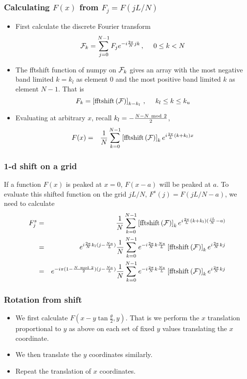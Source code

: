 \documentclass{beamer}
\begin{document}
\begin{frame}
\frametitle{Calculating $F(x)$ from $F_j=F(jL/N)$}
\begin{itemize}
\item
First calculate the discrete Fourier transform
\begin{equation}
{\cal F}_k  = \sum_{j=0}^{N-1} F_j e^{-i\frac{2\pi}{N} jk}\,,
\ \ \ \ 0 \le k < N
\end{equation}
\item
The fftshift function of numpy on ${\cal F}_k$ gives an array 
with the most negative band limited $k = k_l$ as element 0 and
the most positive band limited $k$ as element $N-1$. That is
\begin{equation}
F_k = \left [{\rm fftshift}\left ({\cal F}\right)\right ]_{k-k_l}\,,
\ \ \ \ k_l \leq k \leq k_u
\end{equation}
\item
Evaluating at arbitrary $x$, recall $k_l = -\frac{N- N~{\rm mod}~2}{2}$,
\begin{eqnarray*}
F(x) &=& \frac{1}{N}\sum_{k=0}^{N-1} \left [{\rm fftshift}\left({\cal F}\right)
\right ]_k e^{i\frac{2\pi}{L} (k+k_l) x}
\end{eqnarray*}

\end{itemize}
\end{frame}

\begin{frame}
\frametitle{1-d shift on a grid}
If a function $F(x)$ is peaked at $x=0$, $F(x-a)$ will be peaked at
$a$. To evaluate this shifted function on the grid $jL/N$,
$F^s(j) = F(jL/N-a)$, we need to calculate
\begin{eqnarray*}
F^s_j &=&
\frac{1}{N}\sum_{k=0}^{N-1}
\left [{\rm fftshift}\left({\cal F}\right) \right ]_k
e^{i\frac{2\pi}{L} (k+k_l) (\frac{jL}{N}-a)}
\nonumber\\
&=&
e^{i\frac{2\pi}{N} k_l (j-\frac{Na}{L})}
\frac{1}{N} \sum_{k=0}^{N-1}
e^{-i\frac{2\pi}{N} k \frac{Na}{L}}
\left [{\rm fftshift}\left({\cal F}\right) \right ]_k
e^{i \frac{2\pi}{N} kj}
\nonumber\\
&=&
e^{-i\pi (1-\frac{N~{\rm mod}~2}{2}) (j-\frac{Na}{L})}
\frac{1}{N} \sum_{k=0}^{N-1}
e^{-i\frac{2\pi}{N} k \frac{Na}{L}}
\left [{\rm fftshift}\left({\cal F}\right) \right ]_k
e^{i \frac{2\pi}{N} kj}
\end{eqnarray*}
\end{frame}
\begin{frame}
\frametitle{Rotation from shift}
\begin{itemize}
\item
We first calculate $F(x-y\tan\frac{\theta}{2},y)$. That is we 
perform the $x$ translation proportional to $y$
as above on each set of fixed $y$ values
translating the $x$ coordinate.
\item
We then translate the $y$ coordinates similarly.
\item
Repeat the translation of $x$ coordinates.

\end{itemize}
\end{frame}
\end{document}
